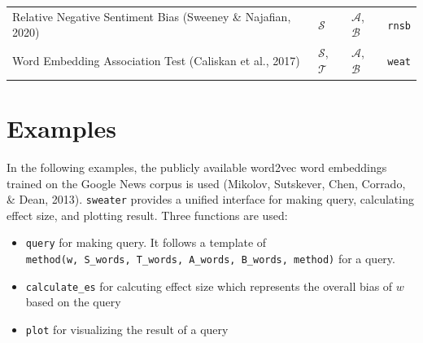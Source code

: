 \documentclass[english,man]{apa6}
\providecommand{\tightlist}{%
  \setlength{\itemsep}{0pt}\setlength{\parskip}{0pt}}
\begin{document}
\begin{longtable}[]{@{}llll@{}}
\begin{minipage}[t]{0.39\columnwidth}\raggedright
Relative Negative Sentiment Bias (Sweeney \& Najafian, 2020)\strut
\end{minipage} & \begin{minipage}[t]{0.21\columnwidth}\raggedright
\(\mathcal{S}\)\strut
\end{minipage} & \begin{minipage}[t]{0.21\columnwidth}\raggedright
\(\mathcal{A}\), \(\mathcal{B}\)\strut
\end{minipage} & \begin{minipage}[t]{0.08\columnwidth}\raggedright
\texttt{rnsb}\strut
\end{minipage}\tabularnewline
\begin{minipage}[t]{0.39\columnwidth}\raggedright
Word Embedding Association Test (Caliskan et al., 2017)\strut
\end{minipage} & \begin{minipage}[t]{0.21\columnwidth}\raggedright
\(\mathcal{S}\), \(\mathcal{T}\)\strut
\end{minipage} & \begin{minipage}[t]{0.21\columnwidth}\raggedright
\(\mathcal{A}\), \(\mathcal{B}\)\strut
\end{minipage} & \begin{minipage}[t]{0.08\columnwidth}\raggedright
\texttt{weat}\strut
\end{minipage}\tabularnewline
\bottomrule
\end{longtable}

\hypertarget{examples}{%
\section{Examples}\label{examples}}

In the following examples, the publicly available word2vec word embeddings trained on the Google News corpus is used (Mikolov, Sutskever, Chen, Corrado, \& Dean, 2013). \texttt{sweater} provides a unified interface for making query, calculating effect size, and plotting result. Three functions are used:

\begin{itemize}
\tightlist
\item
  \texttt{query} for making query. It follows a template of \texttt{method(w,\ S\_words,\ T\_words,\ A\_words,\ B\_words,\ method)} for a query.
\item
  \texttt{calculate\_es} for calcuting effect size which represents the overall bias of \(w\) based on the query
\item
  \texttt{plot} for visualizing the result of a query
\end{itemize}
\end{document}
